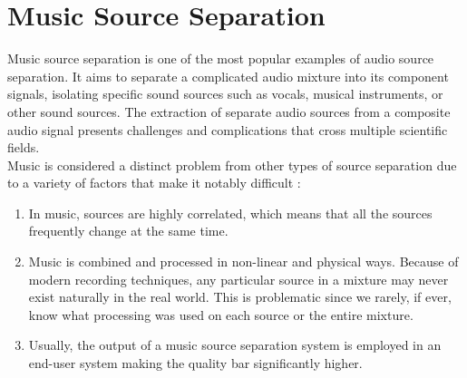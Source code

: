 \section{Music Source Separation}
Music source separation is one of the most popular examples of audio source separation. It aims to separate a complicated audio mixture into its component signals, isolating specific sound sources such as vocals, musical instruments, or other sound sources. The extraction of separate audio sources from a composite audio signal presents challenges and complications that cross multiple scientific fields.\\
Music is considered a distinct problem from other types of source separation due to a variety of factors that make it notably difficult \cite{cano2019}:
\begin{enumerate}
    \item In music, sources are highly correlated, which means that all the sources frequently change at the same time.
    \item Music is combined and processed in non-linear and physical ways. Because of modern recording techniques, any particular source in a mixture may never exist naturally in the real world. This is problematic since we rarely, if ever, know what processing was used on each source or the entire mixture.
    \item Usually, the output of a music source separation system is employed in an end-user system making the quality bar significantly higher.
\end{enumerate}


